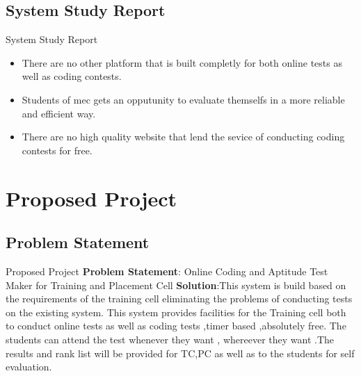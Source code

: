 \documentclass{beamer}
\begin{document}
\subsection{System Study Report}

\begin{frame}{System Study Report}
\begin{itemize}
\item There are no other platform that is built completly for both online tests as well as coding contests.
\item Students of mec gets an opputunity to evaluate themselfs in a more reliable and efficient way.
\item There are no high quality website that lend the sevice of conducting coding contests for free.
\end{itemize}

\end{frame}

\section{Proposed Project}
\subsection{Problem Statement}
\begin{frame}{Proposed Project}
\textbf{Problem Statement}: Online Coding and Aptitude Test Maker for Training and Placement Cell
\linebreak\linebreak
\textbf{Solution}:This system is build based on the requirements of the training cell
eliminating the problems of conducting tests on the existing system.
This system provides facilities for the Training cell both to conduct
online tests as well as coding tests ,timer based ,absolutely free.\linebreak
The students can attend the test whenever they want , whereever
they want .The results and rank list will be provided for TC,PC as well as to the students for self evaluation.

\end{frame}
\end{document}
